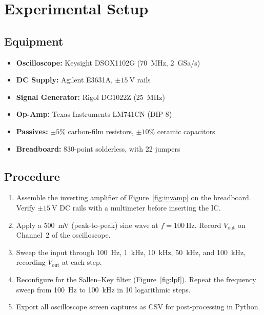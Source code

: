 \section{Experimental Setup}

\subsection{Equipment}

\begin{itemize}
  \item \textbf{Oscilloscope:} Keysight DSOX1102G (70~MHz, 2~GSa/s)
  \item \textbf{DC Supply:} Agilent E3631A, $\pm\qty{15}{\V}$ rails
  \item \textbf{Signal Generator:} Rigol DG1022Z (25~MHz)
  \item \textbf{Op-Amp:} Texas Instruments LM741CN (DIP-8)
  \item \textbf{Passives:} $\pm5\%$ carbon-film resistors,
        $\pm10\%$ ceramic capacitors
  \item \textbf{Breadboard:} 830-point solderless, with
        \qty{22}{\AWG} jumpers
\end{itemize}

\subsection{Procedure}

\begin{enumerate}[label=\textbf{\arabic*.},leftmargin=2.5em]
  \item Assemble the inverting amplifier of Figure~\ref{fig:invamp} on the
        breadboard. Verify $\pm\qty{15}{\V}$ DC rails with a multimeter before
        inserting the IC.
  \item Apply a \qty{500}{\mV} (peak-to-peak) sine wave at
        $f=\qty{100}{\Hz}$. Record $V_{\text{out}}$ on Channel~2 of the
        oscilloscope.
  \item Sweep the input through \qty{100}{\Hz}, \qty{1}{\kHz},
        \qty{10}{\kHz}, \qty{50}{\kHz}, and \qty{100}{\kHz}, recording
        $V_{\text{out}}$ at each step.
  \item Reconfigure for the Sallen--Key filter (Figure~\ref{fig:lpf}).
        Repeat the frequency sweep from \qty{100}{\Hz} to
        \qty{100}{\kHz} in 10 logarithmic steps.
  \item Export all oscilloscope screen captures as CSV for post-processing
        in Python.
\end{enumerate}

